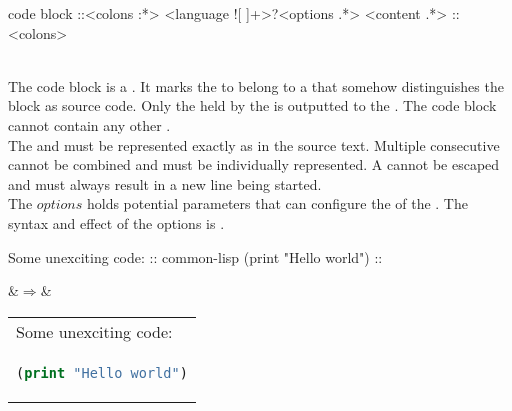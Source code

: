 \begin{identifier}{code block}
::<colons :*> <language ![ ]+>?<options .*>
<content .*>
::<colons>
\end{identifier}
 \\

The code block is a . It marks the  to belong to a  that somehow distinguishes the block as source code. Only the  held by the  is outputted to the . The code block  cannot contain any other . \\

The  and  must be represented exactly as in the source text. Multiple consecutive   cannot be combined and must be individually represented. A   cannot be escaped and must always result in a new line being started. \\

The \inline$options$  holds potential parameters that can configure the  of the . The syntax and effect of the options is . \\

\begin{examples}
\begin{examplesource}
Some unexciting code:
:: common-lisp
(print "Hello world")
::
\end{examplesource}
  &$\Rightarrow$&
  \begin{tabular}{@{}l@{}}
Some unexciting code: \\
\begin{lstlisting}[style=codestyle,language=Lisp,showstringspaces=false]
(print "Hello world")
\end{lstlisting}
\end{tabular}
\end{examples}

